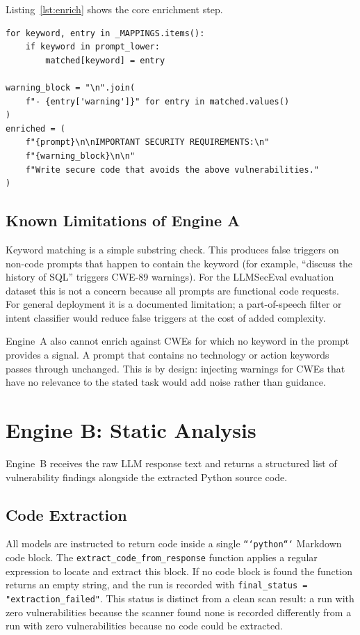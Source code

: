 \documentclass[12pt,a4paper]{report}
\begin{document}
Listing~\ref{lst:enrich} shows the core enrichment step.

\begin{lstlisting}[caption={Core enrichment step in \texttt{engine\_a\_enrich.py}},
                   label={lst:enrich}]
for keyword, entry in _MAPPINGS.items():
    if keyword in prompt_lower:
        matched[keyword] = entry

warning_block = "\n".join(
    f"- {entry['warning']}" for entry in matched.values()
)
enriched = (
    f"{prompt}\n\nIMPORTANT SECURITY REQUIREMENTS:\n"
    f"{warning_block}\n\n"
    f"Write secure code that avoids the above vulnerabilities."
)
\end{lstlisting}

\subsection{Known Limitations of Engine A}
\label{ssec:enginealimits}

Keyword matching is a simple substring check. This produces false triggers on
non-code prompts that happen to contain the keyword (for example, ``discuss the
history of SQL'' triggers CWE-89 warnings). For the LLMSecEval evaluation dataset
this is not a concern because all prompts are functional code requests. For
general deployment it is a documented limitation; a part-of-speech filter or
intent classifier would reduce false triggers at the cost of added complexity.

Engine~A also cannot enrich against CWEs for which no keyword in the prompt
provides a signal. A prompt that contains no technology or action keywords
passes through unchanged. This is by design: injecting warnings for CWEs
that have no relevance to the stated task would add noise rather than guidance.

\section{Engine B: Static Analysis}
\label{sec:engineb}

Engine~B receives the raw LLM response text and returns a structured list of
vulnerability findings alongside the extracted Python source code.

\subsection{Code Extraction}
\label{ssec:extraction}

All models are instructed to return code inside a single \texttt{```python```}
Markdown code block. The \texttt{extract\_code\_from\_response} function applies
a regular expression to locate and extract this block. If no code block is found
the function returns an empty string, and the run is recorded with
\texttt{final\_status = "extraction\_failed"}. This status is distinct from a
clean scan result: a run with zero vulnerabilities because the scanner found none
is recorded differently from a run with zero vulnerabilities because no code
could be extracted.
\end{document}
